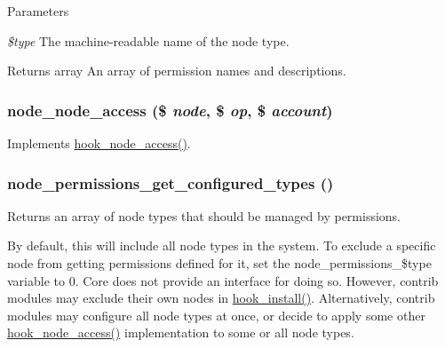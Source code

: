 \begin{DoxyParams}{Parameters}
\item[{\em \$type}]The machine-\/readable name of the node type.\end{DoxyParams}
\begin{DoxyReturn}{Returns}
array An array of permission names and descriptions. 
\end{DoxyReturn}
\hypertarget{group__node__access_gae826daeafed8b20300a370c2022cc2c1}{
\subsubsection[{node\_\-node\_\-access}]{\setlength{\rightskip}{0pt plus 5cm}node\_\-node\_\-access (\$ {\em node}, \/  \$ {\em op}, \/  \$ {\em account})}}
\label{group__node__access_gae826daeafed8b20300a370c2022cc2c1}
Implements \hyperlink{group__node__access_ga75a280ea1fbe0fb6ca034f8aad06d58d}{hook\_\-node\_\-access()}. \hypertarget{group__node__access_ga75960e1cc5852c75c6347ab938938f9b}{
\subsubsection[{node\_\-permissions\_\-get\_\-configured\_\-types}]{\setlength{\rightskip}{0pt plus 5cm}node\_\-permissions\_\-get\_\-configured\_\-types ()}}
\label{group__node__access_ga75960e1cc5852c75c6347ab938938f9b}
Returns an array of node types that should be managed by permissions.

By default, this will include all node types in the system. To exclude a specific node from getting permissions defined for it, set the node\_\-permissions\_\-\$type variable to 0. Core does not provide an interface for doing so. However, contrib modules may exclude their own nodes in \hyperlink{group__hooks_ga1ecdb5a2a046ea63dc790c3ed90338e5}{hook\_\-install()}. Alternatively, contrib modules may configure all node types at once, or decide to apply some other \hyperlink{group__node__access_ga75a280ea1fbe0fb6ca034f8aad06d58d}{hook\_\-node\_\-access()} implementation to some or all node types.

